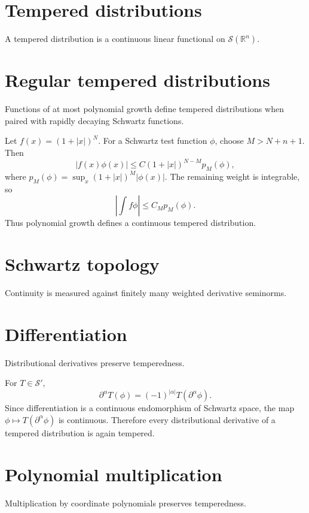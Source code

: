 \section{Tempered distributions}
A tempered distribution is a continuous linear functional on $\mathcal S(\mathbb R^n)$.

\section{Regular tempered distributions}
Functions of at most polynomial growth define tempered distributions when paired with rapidly decaying Schwartz functions.


\begin{example}\label{ex:iii18-expand-01}
Let \(f(x)=(1+|x|)^N\). For a Schwartz test function \(\phi\), choose
\(M>N+n+1\). Then
\[
|f(x)\phi(x)|\le C(1+|x|)^{N-M}p_M(\phi),
\]
where \(p_M(\phi)=\sup_x(1+|x|)^M|\phi(x)|\). The remaining weight is
integrable, so
\[
\left|\int f\phi\right|\le C_M p_M(\phi).
\]
Thus polynomial growth defines a continuous tempered distribution.
\end{example}
\section{Schwartz topology}
Continuity is measured against finitely many weighted derivative seminorms.

\section{Differentiation}
Distributional derivatives preserve temperedness.


\begin{example}\label{ex:iii18-expand-02}
For \(T\in\mathcal S'\),
\[
\partial^\alpha T(\phi)=(-1)^{|\alpha|}T(\partial^\alpha\phi).
\]
Since differentiation is a continuous endomorphism of Schwartz space, the map
\(\phi\mapsto T(\partial^\alpha\phi)\) is continuous. Therefore every
distributional derivative of a tempered distribution is again tempered.
\end{example}
\section{Polynomial multiplication}
Multiplication by coordinate polynomials preserves temperedness.

